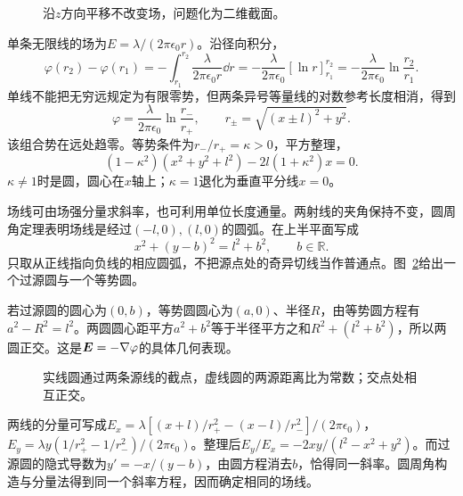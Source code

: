 \begin{figure}[H]\centering
{}
\caption{沿$z$方向平移不改变场，问题化为二维截面。}\label{fig:es1-e4-q}
\end{figure}
\begin{solution}
单条无限线的场为$E=\lambda/(2\pi\epsilon_0r)$。沿径向积分，
\[\varphi(r_2)-\varphi(r_1)=-\int_{r_1}^{r_2}\frac{\lambda}{2\pi\epsilon_0r}\dd r
=-\frac{\lambda}{2\pi\epsilon_0}[\ln r]_{r_1}^{r_2}
=-\frac{\lambda}{2\pi\epsilon_0}\ln\frac{r_2}{r_1}.\]
单线不能把无穷远规定为有限零势，但两条异号等量线的对数参考长度相消，得到
\[\varphi=\frac\lambda{2\pi\epsilon_0}\ln\frac{r_-}{r_+},\qquad
r_\pm=\sqrt{(x\pm l)^2+y^2}.\]
该组合势在远处趋零。等势条件为$r_-/r_+=\kappa>0$，平方整理，
\[(1-\kappa^2)(x^2+y^2+l^2)-2l(1+\kappa^2)x=0.\]
$\kappa\ne1$时是圆，圆心在$x$轴上；$\kappa=1$退化为垂直平分线$x=0$。

场线可由场强分量求斜率，也可利用单位长度通量。两射线的夹角保持不变，圆周角定理表明场线是经过$(-l,0),(l,0)$的圆弧。在上半平面写成
\[\boxed{x^2+(y-b)^2=l^2+b^2},\qquad b\in\mathbb R.
\]
只取从正线指向负线的相应圆弧，不把源点处的奇异切线当作普通点。图~\ref{fig:es1-e4-s}给出一个过源圆与一个等势圆。

若过源圆的圆心为$(0,b)$，等势圆圆心为$(a,0)$、半径$R$，由等势圆方程有$a^2-R^2=l^2$。两圆圆心距平方$a^2+b^2$等于半径平方之和$R^2+(l^2+b^2)$，所以两圆正交。这是$\bm{E}=-\nabla\varphi$的具体几何表现。
\begin{figure}[H]\centering
{}
\caption{实线圆通过两条源线的截点，虚线圆的两源距离比为常数；交点处相互正交。}\label{fig:es1-e4-s}
\end{figure}


两线的分量可写成$E_x=\lambda[(x+l)/r_+^2-(x-l)/r_-^2]/(2\pi\epsilon_0)$，$E_y=\lambda y(1/r_+^2-1/r_-^2)/(2\pi\epsilon_0)$。整理后$E_y/E_x=-2xy/(l^2-x^2+y^2)$。而过源圆的隐式导数为$y'=-x/(y-b)$，由圆方程消去$b$，恰得同一斜率。圆周角构造与分量法得到同一个斜率方程，因而确定相同的场线。
\end{solution}

